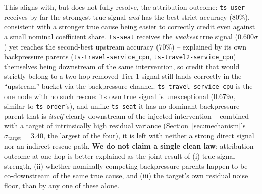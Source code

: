 \documentclass[journal, 10pt]{IEEEtran}
\begin{document}
This aligns with, but does not fully resolve, the attribution outcome: \texttt{ts-user} receives by far the strongest true signal \emph{and} has the best strict accuracy ($80\%$), consistent with a stronger true cause being easier to correctly credit even against a small nominal coefficient share. \texttt{ts-seat} receives the \emph{weakest} true signal ($0.600\sigma$) yet reaches the second-best upstream accuracy ($70\%$) -- explained by its own backpressure parents (\texttt{ts-travel-service\_cpu}, \texttt{ts-travel2-service\_cpu}) themselves being downstream of the same intervention, so credit that would strictly belong to a two-hop-removed Tier-1 signal still lands correctly in the ``upstream'' bucket via the backpressure channel. \texttt{ts-travel-service\_cpu} is the one node with no such rescue: its own true signal is unexceptional ($0.679\sigma$, similar to \texttt{ts-order}'s), and unlike \texttt{ts-seat} it has no dominant backpressure parent that is \emph{itself} clearly downstream of the injected intervention -- combined with a target of intrinsically high residual variance (Section~\ref{sec:mechanism}'s $\sigma_{\text{target}}=3.40$, the largest of the four), it is left with neither a strong direct signal nor an indirect rescue path. \textbf{We do not claim a single clean law}: attribution outcome at one hop is better explained as the joint result of (i) true signal strength, (ii) whether nominally-competing backpressure parents happen to be co-downstream of the same true cause, and (iii) the target's own residual noise floor, than by any one of these alone.
\end{document}
